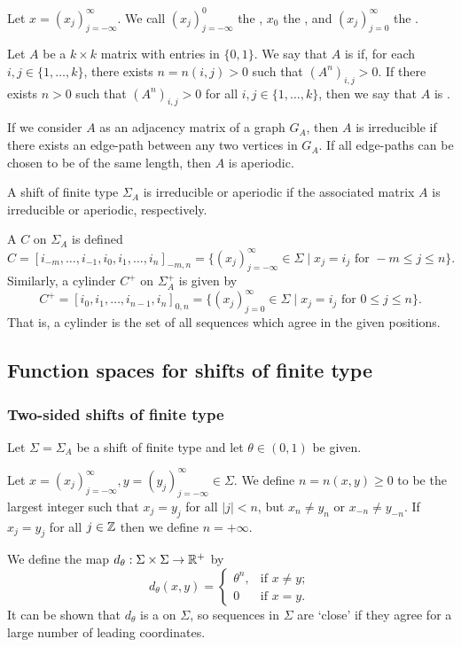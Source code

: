 Let $x = (x_j)_{j = -\infty}^\infty$. We call $(x_j)_{j = -\infty}^0$ the , $x_0$ the , and $(x_j)_{j = 0}^\infty$ the .

Let $A$ be a $k \times k$ matrix with entries in $\{0, 1\}$. We say that $A$ is  if, for each $i, j \in \{1, \dots, k\}$, there exists $n = n(i, j) > 0$ such that $(A^n)_{i, j} > 0$. If there exists $n > 0$ such that $(A^n)_{i, j} > 0$ for all $i, j \in \{1, \dots, k\}$, then we say that $A$ is .

If we consider $A$ as an adjacency matrix of a graph $G_A$, then $A$ is irreducible if there exists an edge-path between any two vertices in $G_A$. If all edge-paths can be chosen to be of the same length, then $A$ is aperiodic.

A shift of finite type $\Sigma_A$ is irreducible or aperiodic if the associated matrix $A$ is irreducible or aperiodic, respectively.

A  $C$ on $\Sigma_A$ is defined
\[
	C = [i_{-m}, \dots, i_{-1}, i_0, i_1, \dots, i_n]_{-m, n} = \{(x_j)_{j = -\infty}^\infty \in \Sigma \mid x_j = i_j \text{ for } -m \leq j \leq n\}.
\]
Similarly, a cylinder $C^+$ on $\Sigma_A^+$ is given by
\[
	C^+ = [i_0, i_1, \dots, i_{n - 1}, i_n]_{0, n} = \{(x_j)_{j = 0}^\infty \in \Sigma \mid x_j = i_j \text{ for } 0 \leq j \leq n\}.
\]
That is, a cylinder is the set of all sequences which agree in the given positions.

\subsection{Function spaces for shifts of finite type}
\subsubsection{Two-sided shifts of finite type}
Let $\Sigma = \Sigma_A$ be a shift of finite type and let $\theta \in (0, 1)$ be given.

Let $x = (x_j)_{j = -\infty}^\infty, y = (y_j)_{j = -\infty}^\infty \in \Sigma$. We define $n = n(x, y) \geq 0$ to be the largest integer such that $x_j = y_j$ for all $|j| < n$, but $x_n \neq y_n$ or $x_{-n} \neq y_{-n}$. If $x_j = y_j$ for all $j \in \mathbb{Z}$ then we define $n = +\infty$.

We define the map $d_\theta : \Sigma \times \Sigma \to \mathbb{R}^+$ by
\[
	d_\theta(x, y) =
	\begin{cases}
		\theta^n, & \text{if } x \neq y; \\
		0 & \text{if } x = y.
	\end{cases}
\]
It can be shown that $d_\theta$ is a  on $\Sigma$, so sequences in $\Sigma$ are `close' if they agree for a large number of leading coordinates.

